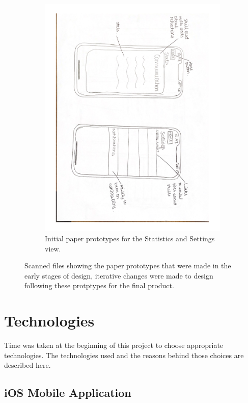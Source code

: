 \documentclass{l4proj}
\begin{document}
\begin{figure}
\begin{subfigure}[b]{1\textwidth}
        \includegraphics[scale=0.45, angle = 90]{images/PaperWireframes2.pdf}
        \caption{Initial paper prototypes for the Statistics and Settings view.}
        \label{fig:PaperWireframe2}
    \end{subfigure}     
    \caption{Scanned files showing the paper prototypes that were made in the early stages of design, iterative changes were made to design following these protptypes for the final product.}
    \label{fig:PaperPrototypes}
\end{figure}

\section{Technologies}
Time was taken at the beginning of this project to choose appropriate technologies. The technologies used and the reasons behind those choices are described here.

\subsection{iOS Mobile Application}
\end{document}
